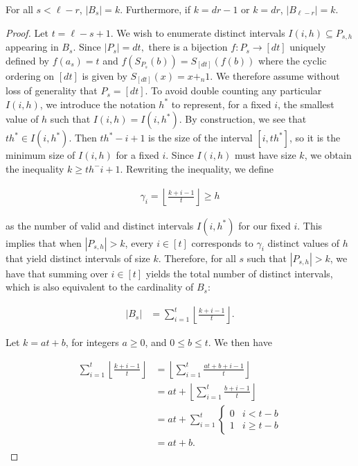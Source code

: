 \documentclass[10pt,a4paper]{amsart}
\begin{document}
\begin{lemma}\label{lemma: SizeBsSmalls}
 For all $s < \ell-r$, $|B_s|=k$. Furthermore, if $k=dr-1$ or $k=dr$, $|B_{\ell-r}|=k$.
 \end{lemma}

\begin{proof}
Let $t=\ell-s+1$. We wish to enumerate distinct intervals $I(i,h) \subseteq P_{s,h}$ appearing in $B_s$. Since $|P_s|=dt,$ there is a bijection $f:P_s\to [dt]$ uniquely defined by $f(a_s)=t$ and $f(S_{P_s}(b))=S_{[dt]}(f(b))$ where the cyclic ordering on $[dt]$ is given by $S_{[dt]}(x)=x+_n 1$. We therefore assume without loss of generality that $P_s=[dt]$. To avoid double counting any particular $I(i, h)$, we introduce the notation $h^*$ to represent, for a fixed $i$, the smallest value of $h$ such that $I(i,h) = I(i, h^*)$. By construction, we see that $th^* \in I(i,h^*)$. Then $th^*-i+1$ is the size of the interval $[i, th^*]$, so it is the minimum size of $I(i, h)$ for a fixed $i$. Since $I(i,h)$ must have size $k$, we obtain the inequality $k \geq th^-i+1$. Rewriting the inequality, we define  

\begin{align*}
    \gamma_i= \left \lfloor \frac{k+i-1}{t} \right \rfloor  \geq h
\end{align*}

as the number of valid and distinct intervals $I(i, h^*)$ for our fixed $i$. This implies that when $|P_{s,h}|> k$, every $i \in [t]$ corresponds to $\gamma_i$ distinct values of $h$ that yield distinct intervals of size $k$. Therefore, for all $s$  such that $|P_{s,h}|>k$, we have that summing over $i \in [t]$ yields the total number of distinct intervals, which is also equivalent to the cardinality of $B_s$:

\begin{align*}
    |B_s| &= \sum_{i=1}^t \left \lfloor \frac{k+i-1}{t} \right \rfloor.  
\end{align*}


Let $k=at+b$, for integers $a \geq 0$, and $0 \leq b \leq t$. We then have

\begin{align*}
     \sum_{i=1}^t \left \lfloor\frac{k+i-1}{t} \right \rfloor 
   & = \left \lfloor  \sum_{i=1}^t \frac{at + b + i-1}{t} \right \rfloor \\
   &= at +  \left \lfloor  \sum_{i=1}^t \frac{b+i-1}{t} \right \rfloor \\
   &= at +\sum_{i=1}^t
    \begin{cases}
        0 & i < t-b\\
        1 & i \geq t-b
    \end{cases} \\
    &= at +b.
\end{align*}


\end{proof}
\end{document}
